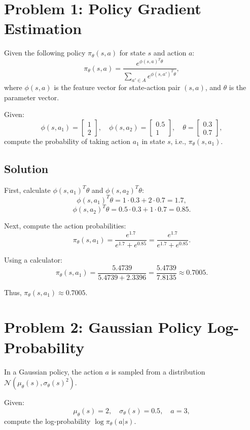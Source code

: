\documentclass[10pt, oneside]{article}
\theoremstyle{definition}
\begin{document}
\section*{Problem 1: Policy Gradient Estimation}
Given the following policy \( \pi_{\theta}(s, a) \) for state \( s \) and action \( a \):
\[
\pi_{\theta}(s, a) = \frac{e^{\phi(s, a)^T \theta}}{\sum_{a' \in A} e^{\phi(s, a')^T \theta}},
\]
where \( \phi(s, a) \) is the feature vector for state-action pair \( (s, a) \), and \( \theta \) is the parameter vector.

Given:
\[
\phi(s, a_1) = \begin{bmatrix} 1 \\ 2 \end{bmatrix}, \quad \phi(s, a_2) = \begin{bmatrix} 0.5 \\ 1 \end{bmatrix}, \quad \theta = \begin{bmatrix} 0.3 \\ 0.7 \end{bmatrix},
\]
compute the probability of taking action \( a_1 \) in state \( s \), i.e., \( \pi_{\theta}(s, a_1) \).

\subsection*{Solution}
First, calculate \( \phi(s, a_1)^T \theta \) and \( \phi(s, a_2)^T \theta \):
\[
\phi(s, a_1)^T \theta = 1 \cdot 0.3 + 2 \cdot 0.7 = 1.7,
\]
\[
\phi(s, a_2)^T \theta = 0.5 \cdot 0.3 + 1 \cdot 0.7 = 0.85.
\]

Next, compute the action probabilities:
\[
\pi_{\theta}(s, a_1) = \frac{e^{1.7}}{e^{1.7} + e^{0.85}} = \frac{e^{1.7}}{e^{1.7} + e^{0.85}}.
\]

Using a calculator:
\[
\pi_{\theta}(s, a_1) = \frac{5.4739}{5.4739 + 2.3396} = \frac{5.4739}{7.8135} \approx 0.7005.
\]

Thus, \( \pi_{\theta}(s, a_1) \approx 0.7005 \).

\section*{Problem 2: Gaussian Policy Log-Probability}
In a Gaussian policy, the action \( a \) is sampled from a distribution \( \mathcal{N}(\mu_{\theta}(s), \sigma_{\theta}(s)^2) \).

Given:
\[
\mu_{\theta}(s) = 2, \quad \sigma_{\theta}(s) = 0.5, \quad a = 3,
\]
compute the log-probability \( \log \pi_{\theta}(a | s) \).
\end{document}
